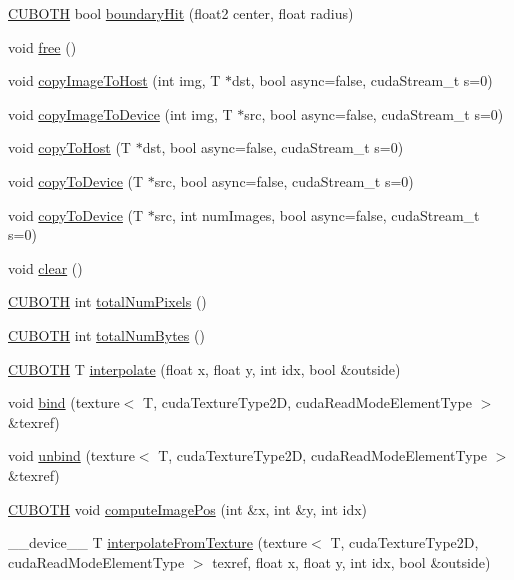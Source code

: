 \begin{DoxyCompactItemize}
\hyperlink{gpu__utils_8h_ac50b87a58396e77c6168aa6f3be3c189}{C\+U\+B\+O\+TH} bool \hyperlink{structcuda_image_list_a0be4b46f22a09af571d491bbc99fc62c}{boundary\+Hit} (float2 center, float radius)
\item 
void \hyperlink{structcuda_image_list_a9c8aaf572231ec29a583e1ecb3954288}{free} ()
\item 
void \hyperlink{structcuda_image_list_a656201f3b644a8435b1c7a37951ff672}{copy\+Image\+To\+Host} (int img, T $\ast$dst, bool async=false, cuda\+Stream\+\_\+t s=0)
\item 
void \hyperlink{structcuda_image_list_aecf1932bc3e9fceff797da80fd19b0a5}{copy\+Image\+To\+Device} (int img, T $\ast$src, bool async=false, cuda\+Stream\+\_\+t s=0)
\item 
void \hyperlink{structcuda_image_list_a5bb9d8aaf4bf1c96bc3e50b6b4407756}{copy\+To\+Host} (T $\ast$dst, bool async=false, cuda\+Stream\+\_\+t s=0)
\item 
void \hyperlink{structcuda_image_list_a090c71fb373e9f7d52a3694a835a5f18}{copy\+To\+Device} (T $\ast$src, bool async=false, cuda\+Stream\+\_\+t s=0)
\item 
void \hyperlink{structcuda_image_list_a76f7051f3ddc025ae684030e86413412}{copy\+To\+Device} (T $\ast$src, int num\+Images, bool async=false, cuda\+Stream\+\_\+t s=0)
\item 
void \hyperlink{structcuda_image_list_a641a7d5e6610bb1c9759a8a9abb94c63}{clear} ()
\item 
\hyperlink{gpu__utils_8h_ac50b87a58396e77c6168aa6f3be3c189}{C\+U\+B\+O\+TH} int \hyperlink{structcuda_image_list_ab2932830664bc51c062c9a1bbca38a37}{total\+Num\+Pixels} ()
\item 
\hyperlink{gpu__utils_8h_ac50b87a58396e77c6168aa6f3be3c189}{C\+U\+B\+O\+TH} int \hyperlink{structcuda_image_list_a6d7497e075d8501461099e602d69dc78}{total\+Num\+Bytes} ()
\item 
\hyperlink{gpu__utils_8h_ac50b87a58396e77c6168aa6f3be3c189}{C\+U\+B\+O\+TH} T \hyperlink{structcuda_image_list_a9f9060dfb911251c4170cad388aeccab}{interpolate} (float x, float y, int idx, bool \&outside)
\item 
void \hyperlink{structcuda_image_list_a36a72cb4f9e988aa7ce04866592aa55d}{bind} (texture$<$ T, cuda\+Texture\+Type2D, cuda\+Read\+Mode\+Element\+Type $>$ \&texref)
\item 
void \hyperlink{structcuda_image_list_a5fd1e6014eb7f4a91e04344e208c70fe}{unbind} (texture$<$ T, cuda\+Texture\+Type2D, cuda\+Read\+Mode\+Element\+Type $>$ \&texref)
\item 
\hyperlink{gpu__utils_8h_ac50b87a58396e77c6168aa6f3be3c189}{C\+U\+B\+O\+TH} void \hyperlink{structcuda_image_list_a579fe28a4c876eb211cd2e5548447a2c}{compute\+Image\+Pos} (int \&x, int \&y, int idx)
\item 
\+\_\+\+\_\+device\+\_\+\+\_\+ T \hyperlink{structcuda_image_list_a0c1befe3e606950d6dd8d78da273ffd8}{interpolate\+From\+Texture} (texture$<$ T, cuda\+Texture\+Type2D, cuda\+Read\+Mode\+Element\+Type $>$ texref, float x, float y, int idx, bool \&outside)
\end{DoxyCompactItemize}
